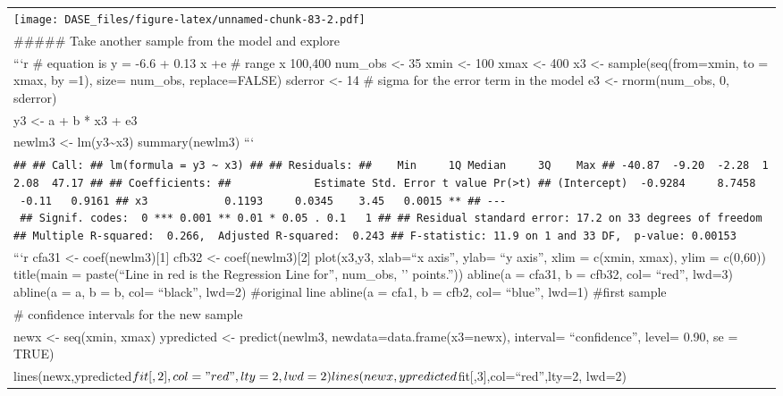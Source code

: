 \documentclass[
]{book}
\begin{document}
\begin{longtable}[]{@{}
  >{\raggedleft\arraybackslash}p{}@{}}
\texttt{[image: DASE\_files/figure-latex/unnamed-chunk-83-2.pdf]} \\
\#\#\#\#\# Take another sample from the model and explore \\
```r
\# equation is y = -6.6 + 0.13 x +e
\# range x 100,400
num\_obs \textless- 35
xmin \textless- 100
xmax \textless- 400
x3 \textless- sample(seq(from=xmin, to = xmax, by =1), size= num\_obs, replace=FALSE)
sderror \textless- 14 \# sigma for the error term in the model
e3 \textless- rnorm(num\_obs, 0, sderror) \\
y3 \textless- a + b * x3 + e3 \\
newlm3 \textless- lm(y3\textasciitilde x3)
summary(newlm3)
``` \\
\texttt{\#\#\ \#\#\ Call:\ \#\#\ lm(formula\ =\ y3\ \textasciitilde{}\ x3)\ \#\#\ \#\#\ Residuals:\ \#\#\ \ \ \ Min\ \ \ \ \ 1Q\ Median\ \ \ \ \ 3Q\ \ \ \ Max\ \#\#\ -40.87\ \ -9.20\ \ -2.28\ \ 12.08\ \ 47.17\ \#\#\ \#\#\ Coefficients:\ \#\#\ \ \ \ \ \ \ \ \ \ \ \ \ Estimate\ Std.\ Error\ t\ value\ Pr(\textgreater{}\textbar{}t\textbar{})\ \#\#\ (Intercept)\ \ -0.9284\ \ \ \ \ 8.7458\ \ \ -0.11\ \ \ 0.9161\ \#\#\ x3\ \ \ \ \ \ \ \ \ \ \ \ 0.1193\ \ \ \ \ 0.0345\ \ \ \ 3.45\ \ \ 0.0015\ **\ \#\#\ -\/-\/-\ \#\#\ Signif.\ codes:\ \ 0\ \textquotesingle{}***\textquotesingle{}\ 0.001\ \textquotesingle{}**\textquotesingle{}\ 0.01\ \textquotesingle{}*\textquotesingle{}\ 0.05\ \textquotesingle{}.\textquotesingle{}\ 0.1\ \textquotesingle{}\ \textquotesingle{}\ 1\ \#\#\ \#\#\ Residual\ standard\ error:\ 17.2\ on\ 33\ degrees\ of\ freedom\ \#\#\ Multiple\ R-squared:\ \ 0.266,\ \ Adjusted\ R-squared:\ \ 0.243\ \#\#\ F-statistic:\ 11.9\ on\ 1\ and\ 33\ DF,\ \ p-value:\ 0.00153} \\
```r
cfa31 \textless- coef(newlm3){[}1{]}
cfb32 \textless- coef(newlm3){[}2{]}
plot(x3,y3, xlab=``x axis'', ylab= ``y axis'', xlim = c(xmin, xmax), ylim = c(0,60))
title(main = paste(``Line in red is the Regression Line for'', num\_obs, '' points.''))
abline(a = cfa31, b = cfb32, col= ``red'', lwd=3)
abline(a = a, b = b, col= ``black'', lwd=2) \#original line
abline(a = cfa1, b = cfb2, col= ``blue'', lwd=1) \#first sample \\
\# confidence intervals for the new sample \\
newx \textless- seq(xmin, xmax)
ypredicted \textless- predict(newlm3, newdata=data.frame(x3=newx), interval= ``confidence'', level= 0.90, se = TRUE) \\
lines(newx,ypredicted\(fit[,2],col="red",lty=2, lwd=2) lines(newx,ypredicted\)fit{[},3{]},col=``red'',lty=2, lwd=2)

\end{longtable}
\end{document}
